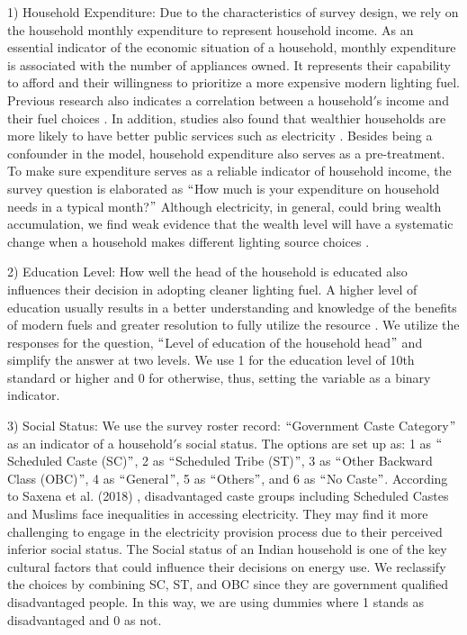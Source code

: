 \documentclass[11pt,english]{article}
\theoremstyle{plain} \newtheorem{claim}{Claim}
\theoremstyle{plain} \newtheorem{prop}{Proposition}
\theoremstyle{plain} \newtheorem{hypo}{Hypothesis}
\begin{document}
1) Household Expenditure: Due to the characteristics of survey design, we rely on the household monthly expenditure to represent household income. As an essential indicator of the economic situation of a household, monthly expenditure is associated with the number of appliances owned. It represents their capability to afford and their willingness to prioritize a more expensive modern lighting fuel. Previous research also indicates a correlation between a household$'$s income and their fuel choices \citep{Pachaurietal2004, Khandkeretal2012, Beheraetal2015}. In addition, studies also found that wealthier households are more likely to have better public services such as electricity \citep{Smitsetal2015}. Besides being a confounder in the model, household expenditure also serves as a pre-treatment. To make sure expenditure serves as a reliable indicator of household income, the survey question is elaborated as $``$How much is your expenditure on household needs in a typical month?$"$ Although electricity, in general, could bring wealth accumulation, we find weak evidence that the wealth level will have a systematic change when a household makes different lighting source choices \citep{PoncedeLeonBaridoetal2017}.

2) Education Level: How well the head of the household is educated also influences their decision in adopting cleaner lighting fuel. A higher level of education usually results in a better understanding and knowledge of the benefits of modern fuels and greater resolution to fully utilize the resource \citep{RaoReddy2007}. We utilize the responses for the question, $``$Level of education of the household head$"$ and simplify the answer at two levels. We use 1 for the education level of 10th standard or higher and 0 for otherwise, thus, setting the variable as a binary indicator.

3) Social Status: We use the survey roster record: $``$Government Caste Category$"$ as an indicator of a household$'$s social status. The options are set up as: 1 as $``$Scheduled Caste (SC)$"$, 2 as $``$Scheduled Tribe (ST)$"$, 3 as $``$Other Backward Class (OBC)$"$, 4 as $``$General$"$, 5 as $``$Others$"$, and 6 as $``$No Caste$"$. According to Saxena et al. (2018) \citep{Saxenaetal2018}, disadvantaged caste groups including Scheduled Castes and Muslims face inequalities in accessing electricity. They may find it more challenging to engage in the electricity provision process due to their perceived inferior social status. The Social status of an Indian household is one of the key cultural factors that could influence their decisions on energy use. We reclassify the choices by combining SC, ST, and OBC since they are government qualified disadvantaged people. In this way, we are using dummies where 1 stands as disadvantaged and 0 as not.
\end{document}
